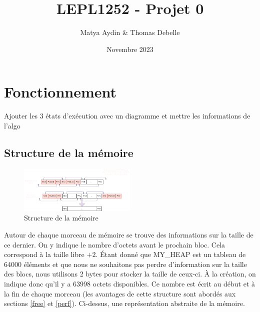 \documentclass{article}
\title{LEPL1252 - Projet 0}
\author{Matya Aydin \& Thomas Debelle}
\date{Novembre 2023}
\begin{document}
\maketitle

\section{Fonctionnement}


Ajouter les 3 états d'exécution avec un diagramme et mettre les informations de l'algo

\subsection{Structure de la mémoire}

\begin{figure}
    \centering
    \includegraphics[width=0.5\textwidth, trim = {0 1.6cm 0 1.5cm}, clip]{fonctionnement.png}
    \caption{Structure de la mémoire}
    \label{fct}

\end{figure}

Autour de chaque morceau de mémoire se trouve des informations sur la taille de ce dernier. On y indique le nombre d'octets avant le prochain bloc. Cela correspond à la taille libre $+ 2$.
Étant donné que MY\_HEAP est un tableau de 64000 éléments et que nous ne souhaitons pas perdre d'information sur la taille des blocs, nous utilisons 2 bytes pour stocker la taille de ceux-ci.
À la création, on indique donc qu'il y a 63998 octets disponibles. Ce nombre est écrit au début et à la fin de chaque morceau (les avantages de cette structure sont abordés aux sections \ref{free} et \ref{perf}). Ci-dessus, une représentation abstraite de la mémoire.
\end{document}
